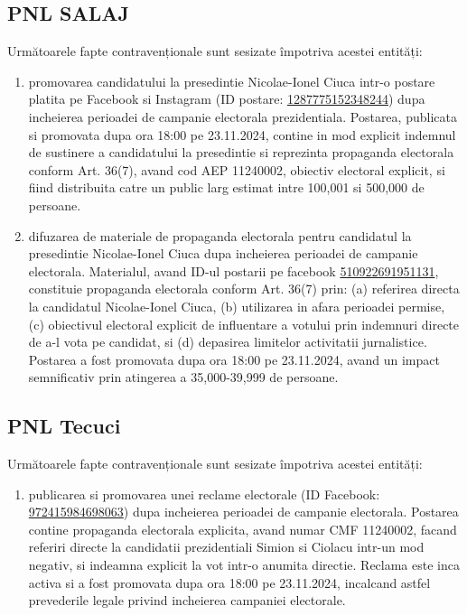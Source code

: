 \documentclass[a4paper,12pt]{article}
\begin{document}
\vspace{0.5cm}

\subsection{PNL SALAJ}
Următoarele fapte contravenționale sunt sesizate împotriva acestei entități:

\begin{enumerate}[leftmargin=*, label=\arabic*.)]
    \item promovarea candidatului la presedintie Nicolae-Ionel Ciuca intr-o postare platita pe Facebook si Instagram (ID postare: \href{https://www.facebook.com/ads/library/?id=1287775152348244}{1287775152348244}) dupa incheierea perioadei de campanie electorala prezidentiala. Postarea, publicata si promovata dupa ora 18:00 pe 23.11.2024, contine in mod explicit indemnul de sustinere a candidatului la presedintie si reprezinta propaganda electorala conform Art. 36(7), avand cod AEP 11240002, obiectiv electoral explicit, si fiind distribuita catre un public larg estimat intre 100,001 si 500,000 de persoane.
    \item difuzarea de materiale de propaganda electorala pentru candidatul la presedintie Nicolae-Ionel Ciuca dupa incheierea perioadei de campanie electorala. Materialul, avand ID-ul postarii pe facebook \href{https://www.facebook.com/ads/library/?id=510922691951131}{510922691951131}, constituie propaganda electorala conform Art. 36(7) prin: (a) referirea directa la candidatul Nicolae-Ionel Ciuca, (b) utilizarea in afara perioadei permise, (c) obiectivul electoral explicit de influentare a votului prin indemnuri directe de a-l vota pe candidat, si (d) depasirea limitelor activitatii jurnalistice. Postarea a fost promovata dupa ora 18:00 pe 23.11.2024, avand un impact semnificativ prin atingerea a 35,000-39,999 de persoane.
\end{enumerate}

\vspace{0.5cm}

\subsection{PNL Tecuci}
Următoarele fapte contravenționale sunt sesizate împotriva acestei entități:

\begin{enumerate}[leftmargin=*, label=\arabic*.)]
    \item publicarea si promovarea unei reclame electorale (ID Facebook: \href{https://www.facebook.com/ads/library/?id=972415984698063}{972415984698063}) dupa incheierea perioadei de campanie electorala. Postarea contine propaganda electorala explicita, avand numar CMF 11240002, facand referiri directe la candidatii prezidentiali Simion si Ciolacu intr-un mod negativ, si indeamna explicit la vot intr-o anumita directie. Reclama este inca activa si a fost promovata dupa ora 18:00 pe 23.11.2024, incalcand astfel prevederile legale privind incheierea campaniei electorale.
\end{enumerate}
\end{document}
